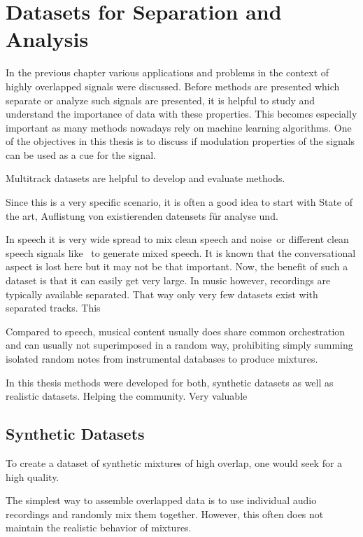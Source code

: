 \chapter{Datasets for Separation and Analysis}

In the previous chapter various applications and problems in the context of highly overlapped signals were discussed.
Before methods are presented which separate or analyze such signals are presented, it is helpful to study and understand the importance of data with these properties.
This becomes especially important as many methods nowadays rely on machine learning algorithms.
One of the objectives in this thesis is to discuss if modulation properties of the signals can be used as a cue for the signal.

Multitrack datasets are helpful to develop and evaluate methods.

Since this is a very specific scenario, it is often a good idea to start with
State of the art, Auflistung von existierenden datensets für analyse und.

In speech it is very wide spread to mix clean speech and noise~\cite{varga93}or different clean speech signals like~\cite{garofolo93} to generate mixed speech.
It is known that the conversational aspect is lost here but it may not be that important.
Now, the benefit of such a dataset is that it can easily get very large.
In music however, recordings are typically available separated.
That way only very few datasets exist with separated tracks. This

Compared to speech, musical content usually does share common orchestration and can usually not superimposed in a random way, prohibiting simply summing isolated random notes from instrumental databases to produce mixtures.

In this thesis methods were developed for both, synthetic datasets as well as realistic datasets.
Helping the community. Very valuable

\section{Synthetic Datasets}

To create a dataset of synthetic mixtures of high overlap, one would seek for a high quality.

The simplest way to assemble overlapped data is to use individual audio recordings and randomly mix them together.
However, this often does not maintain the realistic behavior of mixtures.

